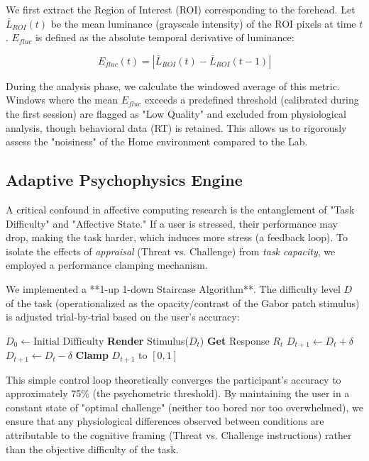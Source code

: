 We first extract the Region of Interest (ROI) corresponding to the forehead. Let $\bar{L}_{ROI}(t)$ be the mean luminance (grayscale intensity) of the ROI pixels at time $t$. $E_{fluc}$ is defined as the absolute temporal derivative of luminance:

\begin{equation}
E_{fluc}(t) = | \bar{L}_{ROI}(t) - \bar{L}_{ROI}(t-1) |
\end{equation}

During the analysis phase, we calculate the windowed average of this metric. Windows where the mean $E_{fluc}$ exceeds a predefined threshold (calibrated during the first session) are flagged as "Low Quality" and excluded from physiological analysis, though behavioral data (RT) is retained. This allows us to rigorously assess the "noisiness" of the Home environment compared to the Lab.

\subsection{Adaptive Psychophysics Engine}

A critical confound in affective computing research is the entanglement of "Task Difficulty" and "Affective State." If a user is stressed, their performance may drop, making the task harder, which induces more stress (a feedback loop). To isolate the effects of \textit{appraisal} (Threat vs. Challenge) from \textit{task capacity}, we employed a performance clamping mechanism.

We implemented a **1-up 1-down Staircase Algorithm**. The difficulty level $D$ of the task (operationalized as the opacity/contrast of the Gabor patch stimulus) is adjusted trial-by-trial based on the user's accuracy:

\begin{algorithmic}
\STATE $D_0 \leftarrow \text{Initial Difficulty}$
    \STATE \textbf{Render} Stimulus($D_t$)
    \STATE \textbf{Get} Response $R_t$
        \STATE $D_{t+1} \leftarrow D_t + \delta$ 
    \ELSE
        \STATE $D_{t+1} \leftarrow D_t - \delta$ 
    \ENDIF
    \STATE \textbf{Clamp} $D_{t+1}$ to $[0, 1]$
\ENDFOR
\end{algorithmic}

This simple control loop theoretically converges the participant's accuracy to approximately 75\% (the psychometric threshold). By maintaining the user in a constant state of "optimal challenge" (neither too bored nor too overwhelmed), we ensure that any physiological differences observed between conditions are attributable to the cognitive framing (Threat vs. Challenge instructions) rather than the objective difficulty of the task.
